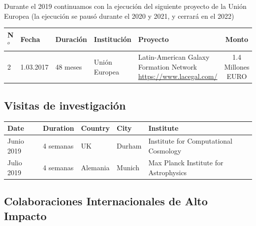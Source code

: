 \documentclass{article}
\begin{document}
\vspace{0.5cm}

Durante el 2019 continuamos con la ejecuci\'on del siguiente proyecto de la Uni\'on Europea (la ejecuci\'on se paus\'o durante el 2020 y 2021, y cerrar\'a  en el 2022)\\

\begin{tabular}{l l l p{2.4cm} p{4.0cm} c}\hline
N$^{o}$ & Fecha & Duraci\'on & Instituci\'on & Proyecto & Monto \\\hline
2 & 1.03.2017 & 48 meses & Uni\'on Europea & Latin-American Galaxy Formation Network \url{https://www.lacegal.com/} & 1.4 Millones EURO \\\hline
\end{tabular}

\subsection{Visitas de investigaci\'on}
\begin{tabular}{p{1.7cm} p{1.3cm} p{2.0cm} p{1.5cm} p{7.0cm}}\hline
Date & Duration & Country & City & Institute\\\hline
Junio 2019 & 4 semanas & UK & Durham & Institute for Computational Cosmology\\
Julio 2019 & 4 semanas & Alemania & Munich & Max Planck Institute for Astrophysics\\\hline
\end{tabular}

\subsection{Colaboraciones Internacionales de Alto Impacto}
\end{document}
